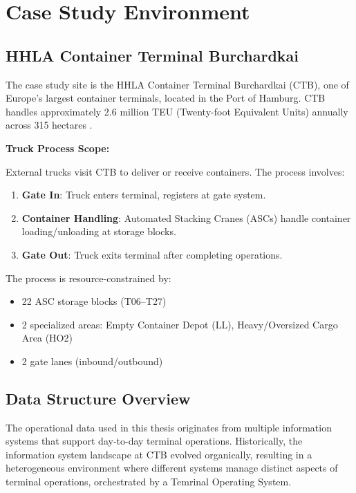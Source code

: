 \section{Case Study Environment}

    \subsection{HHLA Container Terminal Burchardkai}
    
    The case study site is the HHLA Container Terminal Burchardkai (CTB), one of Europe's largest container terminals, located in the Port of Hamburg. CTB handles approximately 2.6 million TEU (Twenty-foot Equivalent Units) annually across 315 hectares \cite{HHLA2023}.
    
    \textbf{Truck Process Scope:}
    
    External trucks visit CTB to deliver or receive containers. The process involves:
    
    \begin{enumerate}
        \item \textbf{Gate In}: Truck enters terminal, registers at gate system.
        \item \textbf{Container Handling}: Automated Stacking Cranes (ASCs) handle container loading/unloading at storage blocks.
        \item \textbf{Gate Out}: Truck exits terminal after completing operations.
    \end{enumerate}
    
    The process is resource-constrained by:
    \begin{itemize}
        \item 22 ASC storage blocks (T06--T27)
        \item 2 specialized areas: Empty Container Depot (LL), Heavy/Oversized Cargo Area (HO2)
        \item 2 gate lanes (inbound/outbound)
    \end{itemize}

    \subsection{Data Structure Overview}

    The operational data used in this thesis originates from multiple information systems that support day-to-day terminal operations. Historically, the information system landscape at CTB evolved organically, resulting in a heterogeneous environment where different systems manage distinct aspects of terminal operations, orchestrated by a Temrinal Operating System. 
    
